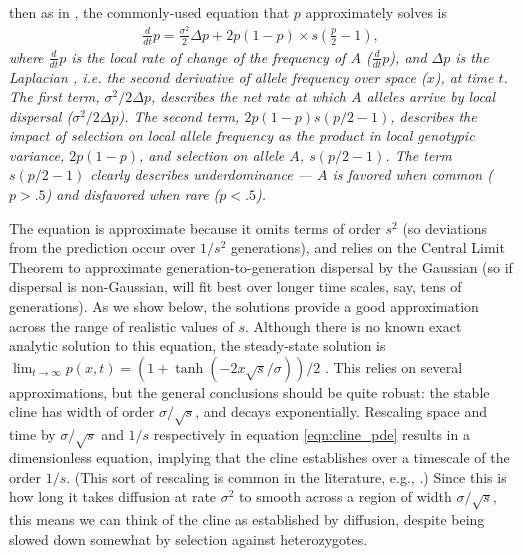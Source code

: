 \documentclass[11pt,letterpaper]{article}
\newcommand{\alisa}[1]{{\em \color{red} #1}}
\newcommand{\yb}[1]{{\em \color{magenta} #1}}
\begin{document}
then as in \citet{Bazykin1969},
the commonly-used equation that $p$ approximately solves is
\begin{align} \label{eqn:cline_pde}
    \frac{d}{dt} p = \frac{\sigma^2}{2} \Delta p +  2 p (1-p)  \times s (\frac{p}{2} - 1), %
\end{align}
\yb{where $ \frac{d}{dt} p$ is the local rate of change of the frequency of $A$ ($\frac{d}{dt} p$), and  $\Delta p$ is the Laplacian\alisa{, i.e. the second derivative of allele frequency over space ($x$), at time $t$.}
The first term,  $\sigma^2/2 \Delta p$, describes the net rate at which $A$ alleles arrive by local dispersal ($\sigma^2/2 \Delta p$). 
The second term,  $2 p (1-p)  s (p/2-1)$, describes the impact of selection on local allele frequency as the product in local genotypic variance, $2 p (1-p)$, and selection on allele $A$, $s (p/2-1)$. The term $s (p/2-1)$ clearly describes  underdominance --- $A$ is favored when common ($p>.5$) and disfavored when rare ($p<.5$).}      

The equation is approximate because it 
omits terms of order $s^2$
(so deviations from the prediction occur over $1/s^2$ generations),
and relies on the Central Limit Theorem to approximate generation-to-generation dispersal by the Gaussian
(so if dispersal is non-Gaussian, will fit best over longer time scales, say, tens of generations).   
As we show below, the solutions provide a good approximation across the range of realistic values of $s$.
Although there is no known exact analytic solution to this equation, 
the steady-state solution is
$\lim_{t \to \infty} p(x,t) = (1+\tanh(-2x\sqrt{s}/\sigma))/2$ \citep{Bazykin1969}. 
This relies on several approximations, but the general conclusions should be quite robust: 
the stable cline has width of order $\sigma/\sqrt{s}$, and decays exponentially. 
Rescaling space and time by $\sigma/\sqrt{s}$ and $1/s$ respectively in equation \eqref{eqn:cline_pde} 
results in a dimensionless equation,
implying that the cline establishes over a timescale of the order $1/s$. 
(This sort of rescaling is common in the literature, e.g., \citep{fisher1950frequencies,Slatkin1973}.)  
Since this is how long it takes diffusion at rate $\sigma^2$ to smooth across a region of width $\sigma/\sqrt{s}$,
this means we can think of
the cline as established by diffusion, 
despite being slowed down somewhat by selection against heterozygotes. 
\end{document}
